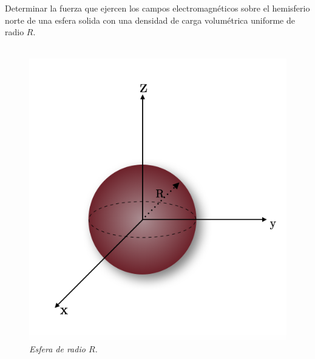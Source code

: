 \documentclass[11pt,fleqn]{book} %
\begin{document}
\begin{example}
Determinar la fuerza que ejercen los campos electromagn\'eticos sobre el hemisferio norte de una esfera solida con una densidad de carga volum\'etrica uniforme de radio $R$. \\\\
\begin{figure}[hbtp]
\centering
\includegraphics[scale=0.55]{Pictures/esferault.png}
\caption{\textit{Esfera de radio $R$.}}
\end{figure}


\end{example}
\end{document}
